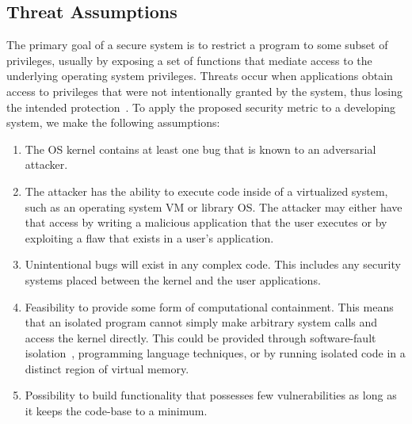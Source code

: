 
\subsection{Threat Assumptions}

The primary goal of a secure system is to restrict a program to some subset
of privileges, 
usually by exposing a set of functions that mediate access to the
underlying operating system privileges. 
Threats occur when applications obtain access to privileges that were not
intentionally granted by the system, 
thus losing the intended protection~\cite{Repy-10}. To apply the proposed security metric to a developing system, we make the following assumptions:

\begin{enumerate}
\item The OS kernel contains at least one bug that is known to an adversarial attacker.

\item The attacker has the ability to execute code inside
of a virtualized system, such as an operating system VM or library OS.
The attacker may either have that access by writing a malicious application
that the user executes or by exploiting a flaw that exists in a user's
application.

\item Unintentional bugs will exist in any complex code. This
includes any security systems placed between the kernel and the user
applications.

\item Feasibility to provide some form of computational 
containment. This means that an isolated program cannot simply
make arbitrary system calls and access the kernel directly. This could
be provided through software-fault isolation~\cite{SFI:93}, programming 
language techniques, or by running isolated code in a
distinct region of virtual memory.

\item Possibility to build functionality that possesses few
vulnerabilities as long as it keeps the code-base to a minimum.


\end{enumerate}

